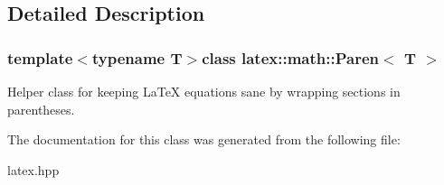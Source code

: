 \subsection{Detailed Description}
\subsubsection*{template$<$typename T$>$class latex\-::math\-::\-Paren$<$ T $>$}

Helper class for keeping La\-Te\-X equations sane by wrapping sections in parentheses. 

The documentation for this class was generated from the following file\-:\begin{DoxyCompactItemize}
\item 
latex.\-hpp\end{DoxyCompactItemize}
